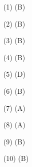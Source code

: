\documentclass[11pt]{article}
\begin{document}
\newpage

\begin{enumerate}

\item[(1)] (B)
\item[(2)] (B)
\item[(3)] (B)
\item[(4)] (B)
\item[(5)] (D)
\item[(6)] (B)
\item[(7)] (A)
\item[(8)] (A)
\item[(9)] (B)
\item[(10)] (B)

\end{enumerate}
\end{document}
